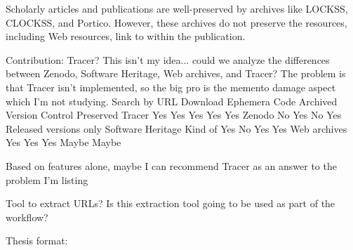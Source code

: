 Scholarly articles and publications are well-preserved by archives like LOCKSS, CLOCKSS, and Portico. However, these archives do not preserve the resources, including Web resources, link to within the publication. 

Contribution:
Tracer? This isn't my idea... could we analyze the differences between Zenodo, Software Heritage, Web archives, and Tracer? The problem is that Tracer isn't implemented, so the big pro is the memento damage aspect which I'm not studying. 
                  Search by URL    Download    Ephemera   Code Archived   Version Control Preserved
Tracer                Yes            Yes          Yes          Yes                 Yes
Zenodo                No             Yes           No          Yes         Released versions only
Software Heritage     Kind of        Yes           No          Yes                 Yes
Web archives          Yes            Yes          Yes         Maybe               Maybe

Based on features alone, maybe I can recommend Tracer as an answer to the problem I'm listing

Tool to extract URLs? Is this extraction tool going to be used as part of the workflow? 

Thesis format: 